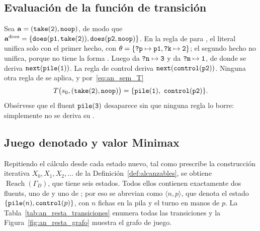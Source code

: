 \subsection{Evaluación de la función de transición}

Sea $\mathbf a = (\texttt{take}(\texttt{2}), \texttt{noop})$, de modo que $\mathbf a^{\mathrm{does}} = \{\texttt{does}(\texttt{p1}, \texttt{take}(\texttt{2})), \texttt{does}(\texttt{p2}, \texttt{noop})\}$. En la regla de  para , el literal  unifica solo con el primer hecho, con $\theta = \{\texttt{?p} \mapsto \texttt{p1}, \texttt{?k} \mapsto \texttt{2}\}$; el segundo hecho no unifica, porque  no tiene la forma . Luego  da $\texttt{?n} \mapsto \texttt{3}$ y  da $\texttt{?m} \mapsto \texttt{1}$, de donde se deriva $\texttt{next}(\texttt{pile}(\texttt{1}))$. La regla de control deriva $\texttt{next}(\texttt{control}(\texttt{p2}))$. Ninguna otra regla de  se aplica, y por~\eqref{eq:an_sem_T}
\begin{equation*}
    T\big(s_0, (\texttt{take}(\texttt{2}), \texttt{noop})\big) = \{\texttt{pile}(\texttt{1}),\ \texttt{control}(\texttt{p2})\}.
\end{equation*}
Obsérvese que el fluent $\texttt{pile}(\texttt{3})$ desaparece sin que ninguna regla lo borre: simplemente no se deriva su .

\subsection{Juego denotado y valor Minimax}

Repitiendo el cálculo desde cada estado nuevo, tal como prescribe la construcción iterativa $X_0, X_1, X_2, \dots$ de la Definición~\ref{def:alcanzables}, se obtiene $\operatorname{Reach}(\Gamma_D)$, que tiene seis estados. Todos ellos contienen exactamente dos fluents, uno de  y uno de ; por eso se abrevian como $\langle n, p \rangle$, que denota el estado $\{\texttt{pile}(n), \texttt{control}(p)\}$, con $n$ fichas en la pila y el turno en manos de $p$. La Tabla~\ref{tab:an_resta_transiciones} enumera todas las transiciones y la Figura~\ref{fig:an_resta_grafo} muestra el grafo de juego.

